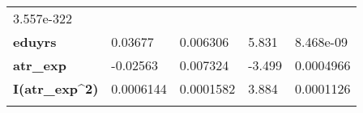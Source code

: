 \documentclass[]{article}
\begin{document}
\begin{longtable}[]{@{}lllll@{}}
\begin{minipage}[t]{0.16\columnwidth}
3.557e-322\strut
\end{minipage}\tabularnewline
\begin{minipage}[t]{0.23\columnwidth}\raggedright
\textbf{eduyrs}\strut
\end{minipage} & \begin{minipage}[t]{0.14\columnwidth}\raggedright
0.03677\strut
\end{minipage} & \begin{minipage}[t]{0.16\columnwidth}\raggedright
0.006306\strut
\end{minipage} & \begin{minipage}[t]{0.12\columnwidth}\raggedright
5.831\strut
\end{minipage} & \begin{minipage}[t]{0.16\columnwidth}\raggedright
8.468e-09\strut
\end{minipage}\tabularnewline
\begin{minipage}[t]{0.23\columnwidth}\raggedright
\textbf{atr\_exp}\strut
\end{minipage} & \begin{minipage}[t]{0.14\columnwidth}\raggedright
-0.02563\strut
\end{minipage} & \begin{minipage}[t]{0.16\columnwidth}\raggedright
0.007324\strut
\end{minipage} & \begin{minipage}[t]{0.12\columnwidth}\raggedright
-3.499\strut
\end{minipage} & \begin{minipage}[t]{0.16\columnwidth}\raggedright
0.0004966\strut
\end{minipage}\tabularnewline
\begin{minipage}[t]{0.23\columnwidth}\raggedright
\textbf{I(atr\_exp\^{}2)}\strut
\end{minipage} & \begin{minipage}[t]{0.14\columnwidth}\raggedright
0.0006144\strut
\end{minipage} & \begin{minipage}[t]{0.16\columnwidth}\raggedright
0.0001582\strut
\end{minipage} & \begin{minipage}[t]{0.12\columnwidth}\raggedright
3.884\strut
\end{minipage} & \begin{minipage}[t]{0.16\columnwidth}\raggedright
0.0001126\strut
\end{minipage}\tabularnewline
\begin{minipage}[t]{0.23\columnwidth}\raggedright

\end{minipage}
\end{longtable}
\end{document}
